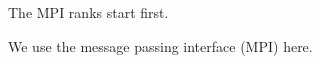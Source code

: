 \documentclass{article}
\begin{document}
The MPI ranks start first.

We use the message passing
interface (MPI) here.
\end{document}
